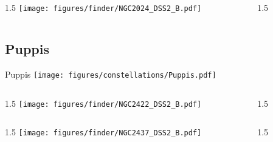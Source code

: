 \documentclass[final]{beamer}
\newlength{\colwidth}
\begin{document}

\begin{frame}[t]{}
  \begin{columns}[T]
    \begin{column}{1.5\colwidth}
      \centering
      \texttt{[image: figures/finder/NGC2024\_DSS2\_B.pdf]}
    \end{column}
    \begin{column}{1.5\colwidth}
      \Large
      
    \end{column}
  \end{columns}
  \vspace{\fill}
\end{frame}

\subsection{Puppis}

\begin{frame}[t]{\LARGE Puppis}
  \centering
  \texttt{[image: figures/constellations/Puppis.pdf]}
\end{frame}


\begin{frame}[t]{}
  \begin{columns}[T]
    \begin{column}{1.5\colwidth}
      \centering
      \texttt{[image: figures/finder/NGC2422\_DSS2\_B.pdf]}
    \end{column}
    \begin{column}{1.5\colwidth}
      \Large
      
    \end{column}
  \end{columns}
  \vspace{\fill}
  \begin{columns}[T]
    \begin{column}{1.5\colwidth}
      \centering
      \texttt{[image: figures/finder/NGC2437\_DSS2\_B.pdf]}
    \end{column}
    \begin{column}{1.5\colwidth}
      \Large
      
    \end{column}
  \end{columns}
\end{frame}
\end{document}
